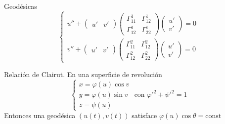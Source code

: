 \documentclass[leqno]{article}
\begin{document}
Geodésicas
\[
  \begin{cases}
   u'' + \begin{pmatrix} u' & v' \end{pmatrix} \begin{pmatrix} \Gamma_{11}^1 & \Gamma _{12}^1 \\ \Gamma _{12}^1 & \Gamma_{22}^1 \end{pmatrix} \begin{pmatrix} u' \\ v' \end{pmatrix} =0  \\
  v'' + \begin{pmatrix} u' & v' \end{pmatrix} \begin{pmatrix} \Gamma _{11}^2 & \Gamma _{12}^2 \\ \Gamma _{12}^2 & \Gamma _{22}^2 \end{pmatrix} \begin{pmatrix} u' \\ v' \end{pmatrix} = 0
  \end{cases}
\]

Relación de Clairut. En una superficie de revolución
\[
\begin{cases}
  x = \varphi (u)\cos v\\
  y = \varphi (u)\sin v \\
  z = \psi (u)
\end{cases}
\text{ con } \varphi '^2 + \psi '^2 = 1
\] 
Entonces una geodésica $(u(t), v(t))$ satisface $\varphi (u)\cos \theta = \text{const}$
\end{document}
